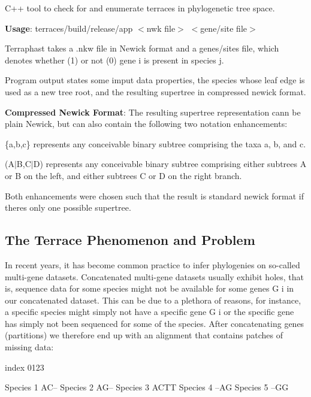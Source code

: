 C++ tool to check for and enumerate terraces in phylogenetic tree space. 



{\bfseries Usage}\+: {\ttfamily terraces/build/release/app $<$nwk file$>$ $<$gene/site file$>$}

Terraphast takes a .nkw file in Newick format and a genes/sites file, which denotes whether (1) or not (0) gene i is present in species j.

Program output states some imput data properties, the species whose leaf edge is used as a new tree root, and the resulting supertree in compressed newick format.

{\bfseries Compressed Newick Format}\+: The resulting supertree representation cann be plain Newick, but can also contain the following two notation enhancements\+:
\begin{DoxyItemize}
\item {\ttfamily \{a,b,c\}} represents any conceivable binary subtree comprising the taxa a, b, and c.
\item {\ttfamily (A$\vert$B,C$\vert$D)} represents any conceivable binary subtree comprising either subtrees A or B on the left, and either subtrees C or D on the right branch.
\end{DoxyItemize}

Both enhancements were chosen such that the result is standard newick format if there\textquotesingle{}s only one possible supertree.

\subsection*{The Terrace Phenomenon and Problem}

In recent years, it has become common practice to infer phylogenies on so-\/called multi-\/gene datasets. Concatenated multi-\/gene datasets usually exhibit holes, that is, sequence data for some species might not be available for some genes G i in our concatenated dataset. This can be due to a plethora of reasons, for instance, a specific species might simply not have a specific gene G i or the specific gene has simply not been sequenced for some of the species. After concatenating genes (partitions) we therefore end up with an alignment that contains patches of missing data\+:


\begin{DoxyCode}
index       0123

Species 1   AC--
Species 2   AG--
Species 3   ACTT
Species 4   --AG
Species 5   --GG
\end{DoxyCode}


